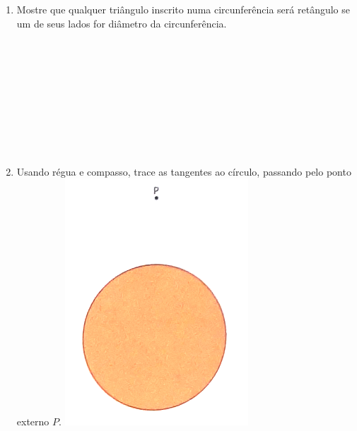 \documentclass[a4paper,14pt]{article}
\begin{document}
\begin{multicols}{2}
\begin{enumerate}
    		\item Mostre que qualquer triângulo inscrito numa circunferência será retângulo se um de seus lados for diâmetro da circunferência. \\\\\\\\\\\\\\\\\\\\
    		\item Usando régua e compasso, trace as tangentes ao círculo, passando pelo ponto externo $P$.
    		\includegraphics[width=1\linewidth]{imagens_8FMA108/imagem4}
    	\end{enumerate}
    $~$ \\ $~$ \\ $~$ \\ $~$ \\ $~$ \\ $~$ \\ $~$ 
    \end{multicols}
\end{document}

